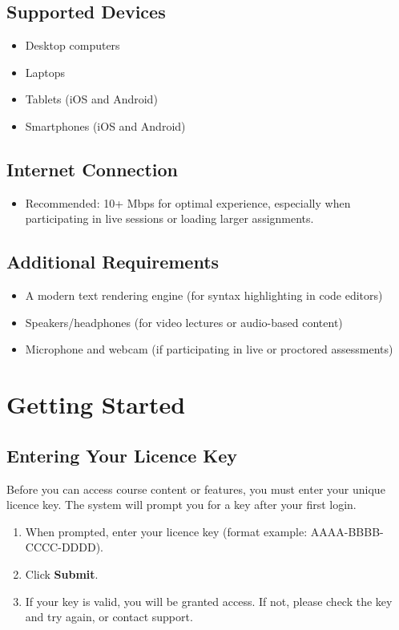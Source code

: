 \documentclass[a4paper,11pt]{scrartcl}
\begin{document}
\subsection{Supported Devices}
\begin{itemize}[leftmargin=*]
    \item Desktop computers
    \item Laptops
    \item Tablets (iOS and Android)
    \item Smartphones (iOS and Android)
\end{itemize}

\subsection{Internet Connection}
\begin{itemize}[leftmargin=*]
    \item Recommended: 10+ Mbps for optimal experience, especially when participating in live sessions or loading larger assignments.
\end{itemize}

\subsection{Additional Requirements}
\begin{itemize}[leftmargin=*]
    \item A modern text rendering engine (for syntax highlighting in code editors)
    \item Speakers/headphones (for video lectures or audio-based content)
    \item Microphone and webcam (if participating in live or proctored assessments)
\end{itemize}

\section{Getting Started}

\subsection{Entering Your Licence Key}
Before you can access course content or features, you must enter your unique licence key. The system will prompt you for a key after your first login.

\begin{enumerate}[leftmargin=*]
    \item When prompted, enter your licence key (format example: AAAA-BBBB-CCCC-DDDD).
    \item Click \textbf{Submit}.
    \item If your key is valid, you will be granted access. If not, please check the key and try again, or contact support.
\end{enumerate}
\end{document}
